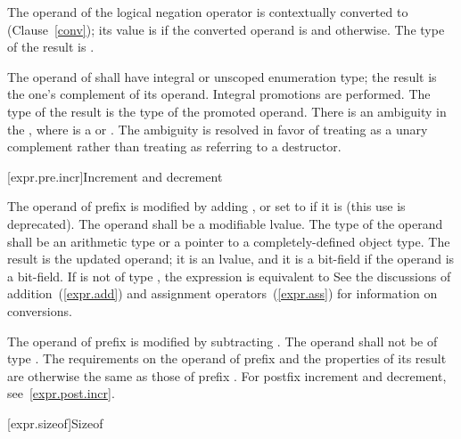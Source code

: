 \pnum
{}%
The operand of the logical negation operator \tcode{!} is contextually
converted to 
(Clause~\ref{conv}); its value is 
if the converted operand is  and  otherwise.
The type of the result is .

\pnum
{}%
The operand of \tcode{\~{}} shall have integral or unscoped enumeration type; the
result is the one's complement of its operand. Integral promotions are
performed. The type of the result is the type of the promoted operand.
There is an ambiguity in the 
, where  is a  or .
The
ambiguity is resolved in favor of treating \tcode{\~{}} as a unary
complement rather than treating  as referring to a
destructor.

[expr.pre.incr]{Increment and decrement}

\pnum
{}%
%
The operand of prefix \tcode{++}
%
%
is modified by adding ,
%
%
%
or set to  if it is  (this use is deprecated).
The operand shall be a modifiable lvalue. The type of the operand shall
be an arithmetic type or a pointer to a completely-defined object type.
The result is the updated operand; it is an lvalue, and it is a
bit-field if the operand is a bit-field. If  is not of type
, the expression  is equivalent to 
%
\enternote
See the discussions of addition~(\ref{expr.add}) and assignment
operators~(\ref{expr.ass}) for information on conversions.
\exitnote 

\pnum
The operand of prefix
%
\tcode{\dcr} is modified by subtracting . The operand shall not
be of type . The requirements on the operand of prefix
\tcode{\dcr} and the properties of its result are otherwise the same as
those of prefix \tcode{++}.
\enternote 
For postfix increment and decrement, see~\ref{expr.post.incr}.
\exitnote 

[expr.sizeof]{Sizeof}

